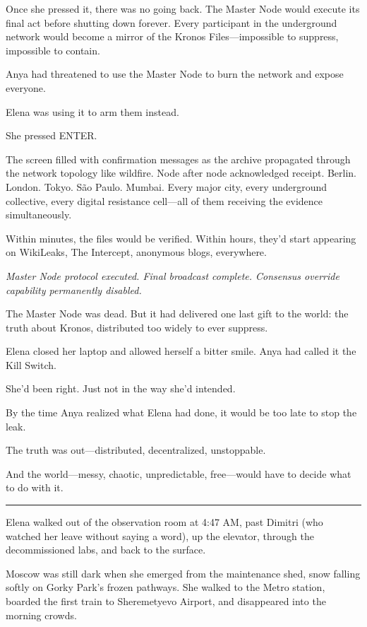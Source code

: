 Once she pressed it, there was no going back. The Master Node would execute its final act before shutting down forever. Every participant in the underground network would become a mirror of the Kronos Files---impossible to suppress, impossible to contain.

Anya had threatened to use the Master Node to burn the network and expose everyone.

Elena was using it to arm them instead.

She pressed ENTER.

The screen filled with confirmation messages as the archive propagated through the network topology like wildfire. Node after node acknowledged receipt. Berlin. London. Tokyo. São Paulo. Mumbai. Every major city, every underground collective, every digital resistance cell---all of them receiving the evidence simultaneously.

Within minutes, the files would be verified. Within hours, they'd start appearing on WikiLeaks, The Intercept, anonymous blogs, everywhere.

\emph{Master Node protocol executed. Final broadcast complete. Consensus override capability permanently disabled.}

The Master Node was dead. But it had delivered one last gift to the world: the truth about Kronos, distributed too widely to ever suppress.

Elena closed her laptop and allowed herself a bitter smile. Anya had called it the Kill Switch.

She'd been right. Just not in the way she'd intended.

By the time Anya realized what Elena had done, it would be too late to stop the leak.

The truth was out---distributed, decentralized, unstoppable.

And the world---messy, chaotic, unpredictable, free---would have to decide what to do with it.

\begin{center}\rule{0.5\linewidth}{0.5pt}\end{center}

Elena walked out of the observation room at 4:47 AM, past Dimitri (who watched her leave without saying a word), up the elevator, through the decommissioned labs, and back to the surface.

Moscow was still dark when she emerged from the maintenance shed, snow falling softly on Gorky Park's frozen pathways. She walked to the Metro station, boarded the first train to Sheremetyevo Airport, and disappeared into the morning crowds.

